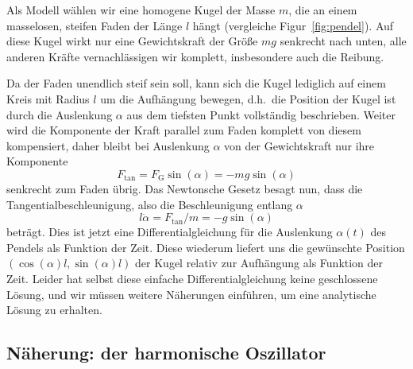 Als Modell wählen wir eine homogene Kugel der Masse $m$, die an einem
masselosen, steifen Faden der Länge $l$ hängt (vergleiche
Figur~\ref{fig:pendel}). Auf diese Kugel wirkt nur eine Gewichtskraft
der Größe $mg$ senkrecht nach unten, alle anderen Kräfte vernachlässigen wir
komplett, insbesondere auch die Reibung.

Da der Faden unendlich steif sein soll, kann sich die Kugel lediglich auf
einem Kreis mit Radius $l$ um die Aufhängung bewegen, d.h.\ die
Position der Kugel ist durch die Auslenkung $\alpha$ aus dem tiefsten
Punkt vollständig beschrieben. Weiter wird die Komponente der Kraft
parallel zum Faden komplett von diesem kompensiert, daher bleibt bei
Auslenkung $\alpha$ von der Gewichtskraft nur ihre Komponente
\begin{equation}
  F_\text{tan} = F_\text{G}\sin(\alpha) = -mg\sin(\alpha)
\end{equation}
senkrecht zum Faden übrig. Das Newtonsche Gesetz besagt nun, dass
die Tangentialbeschleunigung, also die Beschleunigung entlang $\alpha$
\begin{equation}
  l\ddot\alpha = F_\text{tan}/m = -g\sin(\alpha)
  \label{eq:pendelgln}
\end{equation}
beträgt. Dies ist jetzt eine Differentialgleichung für die Auslenkung
$\alpha(t)$ des Pendels als Funktion der Zeit. Diese wiederum liefert
uns die gewünschte Position $(\cos(\alpha)l,\sin(\alpha)l)$ der Kugel
relativ zur Aufhängung als Funktion der Zeit. Leider hat selbst diese
einfache Differentialgleichung keine geschlossene Lösung, und wir
müssen weitere Näherungen einführen, um eine analytische Lösung zu
erhalten.

\subsection{Näherung: der harmonische Oszillator}

